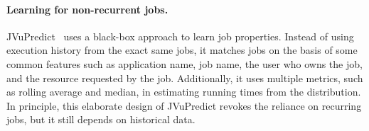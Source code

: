 

\paragraph{Learning for non-recurrent jobs.}
JVuPredict~\cite{jamiasvu} uses a black-box approach to learn
job properties. Instead of using execution history from the exact same jobs,
it matches jobs on the basis of some common features such as application name,
job name, the user who owns the job, and the resource requested by the job.
Additionally, 
it uses multiple metrics, such as rolling
average and median,
in estimating running times from the distribution.
In principle, this elaborate design of JVuPredict 
revokes the reliance on recurring jobs, but it still depends on historical data.


